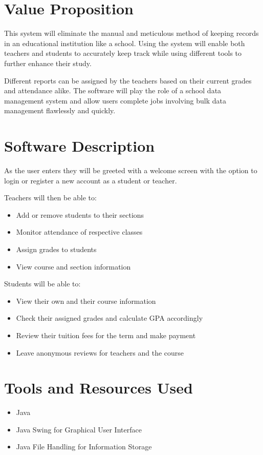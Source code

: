 \documentclass[a4paper,12pt]{article}
\begin{document}
\section{Value Proposition}
\enlargethispage{\baselineskip}
This system will eliminate the manual and meticulous method of keeping records in an educational institution like a school. Using the system will enable both teachers and students to accurately keep track while using different tools to further enhance their study. \par Different reports can be assigned by the teachers based on their current grades and attendance alike. The software will play the role of a school data management system and allow users complete jobs involving bulk data management flawlessly and quickly.

\section{Software Description}
\enlargethispage{\baselineskip}
As the user enters they will be greeted with a welcome screen with the option to login or register a new account as a student or teacher. 
\par
Teachers will then be able to:
\begin{itemize}
    \item Add or remove students to their sections
    \item Monitor attendance of respective classes
    \item Assign grades to students
    \item View course and section information
\end{itemize}
Students will be able to:
\begin{itemize}
    \item View their own and their course information
    \item Check their assigned grades and calculate GPA accordingly
    \item Review their tuition fees for the term and make payment
    \item Leave anonymous reviews for teachers and the course
\end{itemize}


\section{Tools and Resources Used}
\enlargethispage{\baselineskip}
\begin{itemize}
    \item Java
    \item Java Swing for Graphical User Interface 
    \item Java File Handling for Information Storage
\end{itemize}
\pagebreak
\end{document}

